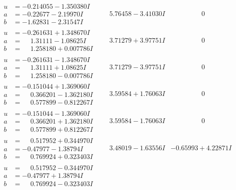 \documentclass[1p]{elsarticle_modified}
\theoremstyle{definition}
\begin{document}
$$\begin{array}{c|c|c}
\begin{aligned}
u &= -0.214055 - 1.350380 I \\
a &= -0.22677 - 2.19970 I \\
b &= -1.62831 - 2.31547 I\end{aligned}
 & \phantom{-}5.76458 - 3.41030 I & \phantom{-0.000000 } 0 \\ \hline\begin{aligned}
u &= -0.261631 + 1.348670 I \\
a &= \phantom{-}1.31111 - 1.08625 I \\
b &= \phantom{-}1.258180 + 0.007786 I\end{aligned}
 & \phantom{-}3.71279 + 3.97751 I & \phantom{-0.000000 } 0 \\ \hline\begin{aligned}
u &= -0.261631 - 1.348670 I \\
a &= \phantom{-}1.31111 + 1.08625 I \\
b &= \phantom{-}1.258180 - 0.007786 I\end{aligned}
 & \phantom{-}3.71279 - 3.97751 I & \phantom{-0.000000 } 0 \\ \hline\begin{aligned}
u &= -0.151044 + 1.369060 I \\
a &= \phantom{-}0.366201 - 1.362180 I \\
b &= \phantom{-}0.577899 - 0.812267 I\end{aligned}
 & \phantom{-}3.59584 + 1.76063 I & \phantom{-0.000000 } 0 \\ \hline\begin{aligned}
u &= -0.151044 - 1.369060 I \\
a &= \phantom{-}0.366201 + 1.362180 I \\
b &= \phantom{-}0.577899 + 0.812267 I\end{aligned}
 & \phantom{-}3.59584 - 1.76063 I & \phantom{-0.000000 } 0 \\ \hline\begin{aligned}
u &= \phantom{-}0.517952 + 0.344970 I \\
a &= -0.47977 - 1.38794 I \\
b &= \phantom{-}0.769924 + 0.323403 I\end{aligned}
 & \phantom{-}3.48019 - 1.63556 I & -0.65993 + 4.22871 I \\ \hline\begin{aligned}
u &= \phantom{-}0.517952 - 0.344970 I \\
a &= -0.47977 + 1.38794 I \\
b &= \phantom{-}0.769924 - 0.323403 I\end{aligned}

\end{array}$$
\end{document}
